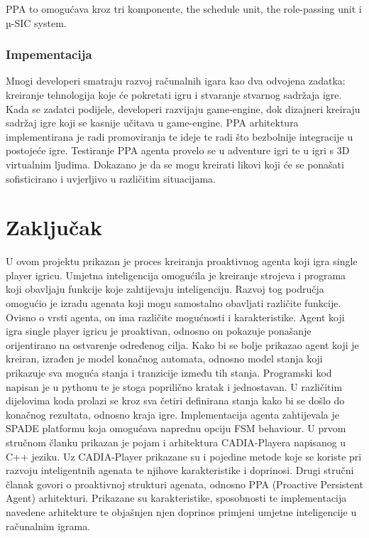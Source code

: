 \documentclass[a4paper,12pt]{foi}
\begin{document}
PPA to omogućava kroz tri komponente, the schedule unit, the role-passing unit i µ-SIC system.

\subsection{Impementacija}
Mnogi developeri smatraju razvoj računalnih igara kao dva odvojena zadatka: kreiranje tehnologija koje će pokretati igru i stvaranje stvarnog sadržaja igre. Kada se zadatci podijele, developeri razvijaju game-engine, dok dizajneri kreiraju sadržaj igre koji se kasnije učitava u game-engine. PPA arhitektura implementirana je radi promoviranja te ideje te radi što bezbolnije integracije u postojeće igre. Testiranje PPA agenta provelo se u adventure igri te u igri s 3D virtualnim ljudima. Dokazano je da se mogu kreirati likovi koji će se ponašati sofisticirano i uvjerljivo u različitim situacijama.

\chapter{Zaključak}
U ovom projektu prikazan je proces kreiranja proaktivnog agenta koji igra single player igricu. Umjetna inteligencija omogućila je kreiranje strojeva i programa koji obavljaju funkcije koje zahtijevaju inteligenciju. Razvoj tog područja omogućio je izradu agenata koji mogu samostalno obavljati različite funkcije. Ovisno o vrsti agenta, on ima različite mogućnosti i karakteristike. Agent koji igra single player igricu je proaktivan, odnosno on pokazuje ponašanje orijentirano na ostvarenje određenog cilja. Kako bi se bolje prikazao agent koji je kreiran, izrađen je model konačnog automata, odnosno model stanja koji prikazuje sva moguća stanja i tranzicije između tih stanja. Programski kod napisan je u pythonu te je stoga poprilično kratak i jednostavan. U različitim dijelovima koda prolazi se kroz sva četiri definirana stanja kako bi se došlo do konačnog rezultata, odnosno kraja igre. Implementacija agenta zahtijevala je SPADE platformu koja omogućava naprednu opciju FSM behaviour.
\newline
U prvom stručnom članku prikazan je pojam i arhitektura CADIA-Playera napisanog u C++ jeziku. Uz CADIA-Player prikazane su i pojedine metode koje se koriste pri razvoju inteligentnih agenata te njihove karakteristike i doprinosi. Drugi stručni članak govori o proaktivnoj strukturi agenata, odnosno PPA (Proactive Persistent Agent) arhitekturi. Prikazane su karakteristike, sposobnosti te implementacija navedene arhitekture te objašnjen njen doprinos primjeni umjetne inteligencije u računalnim igrama. 


\end{document}
